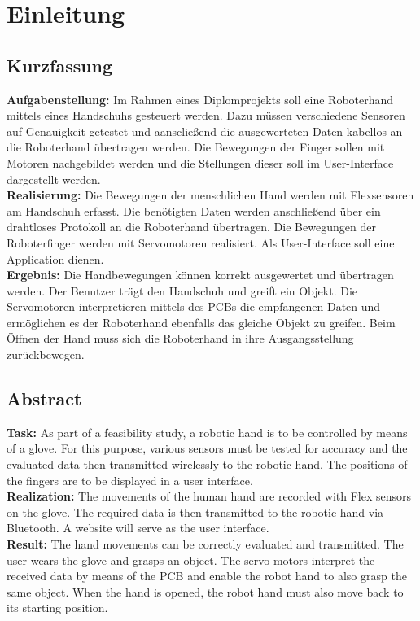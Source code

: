 \documentclass[11pt]{article}
\begin{document}

\tableofcontents


\pagebreak

\section{Einleitung}

\subsection{Kurzfassung}
\textbf{Aufgabenstellung:} 
Im Rahmen eines Diplomprojekts soll eine Roboterhand mittels eines Handschuhs gesteuert werden. 
Dazu müssen verschiedene Sensoren auf Genauigkeit getestet und aanscließend die ausgewerteten Daten kabellos an die
Roboterhand übertragen werden. Die Bewegungen der Finger sollen mit Motoren nachgebildet werden und die Stellungen
dieser soll im User-Interface dargestellt werden. \\
\textbf{Realisierung:} 
Die Bewegungen der menschlichen Hand werden mit Flexsensoren am Handschuh erfasst. Die benötigten Daten werden
anschließend über ein drahtloses Protokoll an die Roboterhand übertragen. Die Bewegungen der Roboterfinger werden mit
Servomotoren realisiert. Als User-Interface soll eine Application dienen. \\
\textbf{Ergebnis:} 
Die Handbewegungen können korrekt ausgewertet und übertragen werden. Der Benutzer trägt den Handschuh und greift 
ein Objekt. Die Servomotoren interpretieren mittels des PCBs die empfangenen Daten und ermöglichen es der Roboterhand 
ebenfalls das gleiche Objekt zu greifen. Beim Öffnen der Hand muss sich die Roboterhand in ihre Ausgangsstellung 
zurückbewegen.

\subsection{Abstract}
\textbf{Task:} 
As part of a feasibility study, a robotic hand is to be controlled by means of a glove. For
this purpose, various sensors must be tested for accuracy and the evaluated data then
transmitted wirelessly to the robotic hand. The positions of the fingers are to be displayed in a
user interface. \\
\textbf{Realization:} 
The movements of the human hand are recorded with Flex sensors on the glove.
The required data is then transmitted to the robotic hand via Bluetooth. A website will serve as
the user interface. \\
\textbf{Result:} 
The hand movements can be correctly evaluated and transmitted. The user wears the
glove and grasps an object. The servo motors interpret the received data by means of the PCB
and enable the robot hand to also grasp the same object. When the hand is opened, the robot
hand must also move back to its starting position.
\end{document}
